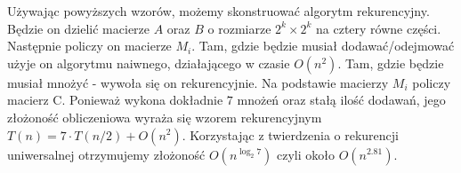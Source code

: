 Używając powyższych wzorów, możemy skonstruować algorytm rekurencyjny.
Będzie on dzielić macierze $A$ oraz $B$ o rozmiarze $2^k \times 2^k$ na cztery równe części.
Następnie policzy on macierze $M_i$.
Tam, gdzie będzie musiał dodawać/odejmować użyje on algorytmu naiwnego, działającego w czasie $O(n^2)$.
Tam, gdzie będzie musiał mnożyć - wywoła się on rekurencyjnie.
Na podstawie macierzy $M_i$ policzy macierz C.
Ponieważ wykona dokładnie $7$ mnożeń oraz stałą ilość dodawań, jego złożoność obliczeniowa wyraża się wzorem rekurencyjnym $T(n) = 7\cdot T(n/2) + O(n^2)$.
Korzystając z twierdzenia o rekurencji uniwersalnej otrzymujemy złożoność $O(n^{\log_2 7})$ czyli około $O(n^{2.81})$.